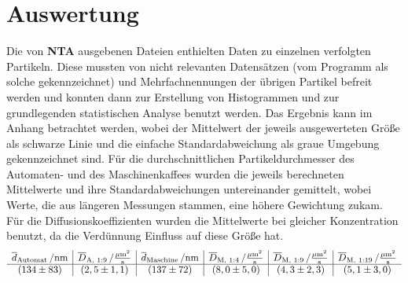 \documentclass[numbers=noenddot,12pt,a4paper]{scrartcl}
\newcommand{\ix}[1]{_\text{#1}}
\begin{document}
\section{Auswertung}
Die von \textbf{NTA} ausgebenen Dateien enthielten Daten zu einzelnen verfolgten Partikeln. Diese mussten von nicht relevanten Datensätzen (vom Programm als solche gekennzeichnet) und Mehrfachnennungen der übrigen Partikel befreit werden und konnten dann zur Erstellung von Histogrammen und zur grundlegenden statistischen Analyse benutzt werden. Das Ergebnis kann im Anhang betrachtet werden, wobei der Mittelwert der jeweils ausgewerteten Größe als schwarze Linie und die einfache Standardabweichung als graue Umgebung gekennzeichnet sind. Für die durchschnittlichen Partikeldurchmesser des Automaten- und des Maschinenkaffees wurden die jeweils berechneten Mittelwerte und ihre Standardabweichungen untereinander gemittelt, wobei Werte, die aus längeren Messungen stammen, eine höhere Gewichtung zukam. Für die Diffusionskoeffizienten wurden die Mittelwerte bei gleicher Konzentration benutzt, da die Verdünnung Einfluss auf diese Größe hat.
\begin{align*}
	\begin{array}{c|c|c|c|c|c}
	\unit[\overline{d}\ix{Automat}]{/nm}& \unit[\overline{D}\ix{A, 1:9}]{/\frac{\mu m^2}{s}} & \unit[\overline{d}\ix{Maschine}]{/nm} & \unit[\overline{D}\ix{M, 1:4}]{/\frac{\mu m^2}{s}} & \unit[\overline{D}\ix{M, 1:9}]{/\frac{\mu m^2}{s}} & \unit[\overline{D}\ix{M, 1:19}]{/\frac{\mu m^2}{s}} \\
	\hline 
\left(134\pm 83\right)	& \left(2,5\pm 1,1 \right) & \left(137\pm 72\right) & \left(8,0\pm 5,0\right) & \left(4,3\pm 2,3\right) & \left(5,1\pm 3,0\right)
	\end{array} 
\end{align*}
\end{document}
